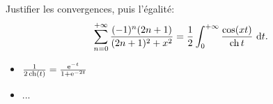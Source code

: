 Justifier les convergences, puis l'égalité:
$$\sum_{n=0}^{+ \infty} \frac{(-1)^n (2n+1)}{(2n+1)^2 + x^2} = \frac{1}{2} \int_{0}^{+ \infty} \frac{\cos (xt)}{\operatorname{ch} t}\ \mathrm{d} t.$$

\begin{itemize}
    \item $\frac{1}{2 \operatorname{ch}(t)} = \frac{\mathrm{e}^{-t}}{1 + \mathrm{e}^{-2t}}$
    \item ...
\end{itemize}